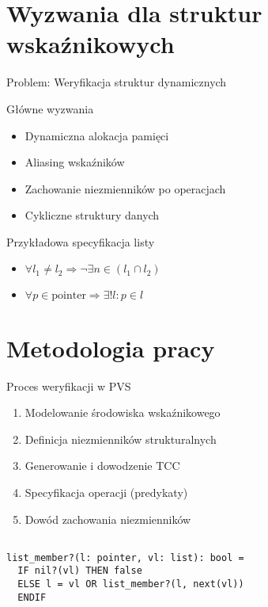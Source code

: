 \documentclass{beamer}
\begin{document}
\section{Wyzwania dla struktur wskaźnikowych}
\begin{frame}{Problem: Weryfikacja struktur dynamicznych}
\begin{alertblock}{Główne wyzwania}
\begin{itemize}
\item Dynamiczna alokacja pamięci
\item Aliasing wskaźników
\item Zachowanie niezmienników po operacjach
\item Cykliczne struktury danych
\end{itemize}
\end{alertblock}

\begin{exampleblock}{Przykładowa specyfikacja listy}
\begin{itemize}
\item $\forall l_1 \neq l_2 \Rightarrow \neg \exists n \in (l_1 \cap l_2)$
\item $\forall p \in \text{pointer} \Rightarrow \exists! l: p \in l$
\end{itemize}
\end{exampleblock}
\end{frame}

\section{Metodologia pracy}
\begin{frame}[fragile]{Proces weryfikacji w PVS}
\begin{enumerate}
\item Modelowanie środowiska wskaźnikowego
\item Definicja niezmienników strukturalnych
\item Generowanie i dowodzenie TCC
\item Specyfikacja operacji (predykaty)
\item Dowód zachowania niezmienników
\end{enumerate}

\begin{verbatim}

list_member?(l: pointer, vl: list): bool = 
  IF nil?(vl) THEN false
  ELSE l = vl OR list_member?(l, next(vl))
  ENDIF
\end{verbatim}
\end{frame}
\end{document}
